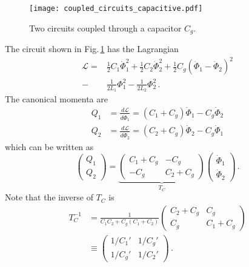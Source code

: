 

\begin{figure}
\begin{centering}
\texttt{[image: coupled\_circuits\_capacitive.pdf]}
\par\end{centering}
\caption{Two circuits coupled through a capacitor $C_g$.}
\label{Fig:coupledCircuits_capacitive}
\end{figure}

The circuit shown in Fig.\,\ref{Fig:coupledCircuits_capacitive} has the Lagrangian
\begin{align}
  \mathcal{L}
  =& \frac{1}{2}C_1\dot{\Phi}_1^2 + \frac{1}{2}C_2\dot{\Phi}_2^2
   + \frac{1}{2}C_g \left( \dot{\Phi}_1 - \dot{\Phi}_2 \right)^2 \nonumber \\
  -& \frac{1}{2L_1}\Phi_1^2 - \frac{1}{2L_2}\Phi_2^2 \, .
\end{align}
The canonical momenta are
\begin{align}
  Q_1 &= \frac{d \mathcal{L}}{d\dot{\Phi}_1} = (C_1 + C_g) \dot{\Phi}_1 - C_g\dot{\Phi}_2 \nonumber \\
  Q_2 &= \frac{d \mathcal{L}}{d\dot{\Phi}_2} = (C_2 + C_g) \dot{\Phi}_2 - C_g\dot{\Phi}_1
\end{align}
which can be written as
\begin{equation}
  \left( \begin{array}{c} Q_1 \\ Q_2 \end{array} \right) =
  \underbrace{
    \left( \begin{array}{cc} C_1 + C_g & -C_g \\ -C_g & C_2 + C_g \end{array} \right)}_{T_C}
  \left( \begin{array}{c} \dot{\Phi}_1 \\ \dot{\Phi}_2 \end{array} \right)
  \, .
\end{equation}
Note that the inverse of $T_C$ is
\begin{align}
  T_C^{-1}
  &= \frac{1}{C_1 C_2 + C_g (C_1 + C_2)}
    \left( \begin{array}{cc} C_2 + C_g & C_g \\ C_g & C_1 + C_g \end{array} \right) \nonumber \\
  &\equiv \left(
    \begin{array}{cc} 1/C_1' & 1/C_g' \\ 1/C_g' & 1/C_2' \end{array}
    \right) \, .
\end{align}
